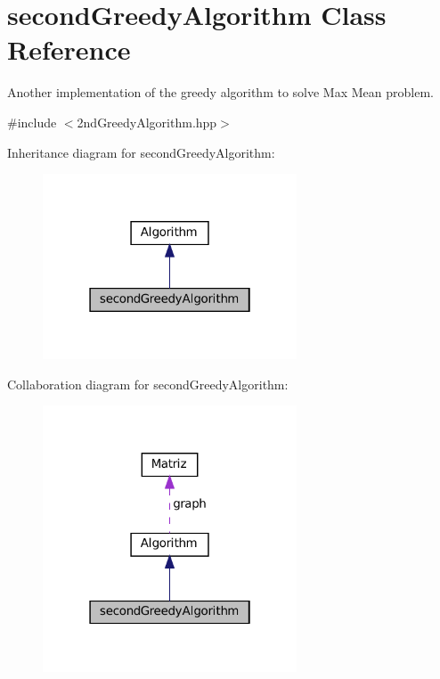 \hypertarget{classsecondGreedyAlgorithm}{}\section{second\+Greedy\+Algorithm Class Reference}
\label{classsecondGreedyAlgorithm}


Another implementation of the greedy algorithm to solve Max Mean problem.  




{\ttfamily \#include $<$2nd\+Greedy\+Algorithm.\+hpp$>$}



Inheritance diagram for second\+Greedy\+Algorithm\+:
\nopagebreak
\begin{figure}[H]
\begin{center}
\leavevmode
\includegraphics[width=214pt]{classsecondGreedyAlgorithm__inherit__graph}
\end{center}
\end{figure}


Collaboration diagram for second\+Greedy\+Algorithm\+:
\nopagebreak
\begin{figure}[H]
\begin{center}
\leavevmode
\includegraphics[width=214pt]{classsecondGreedyAlgorithm__coll__graph}
\end{center}
\end{figure}
